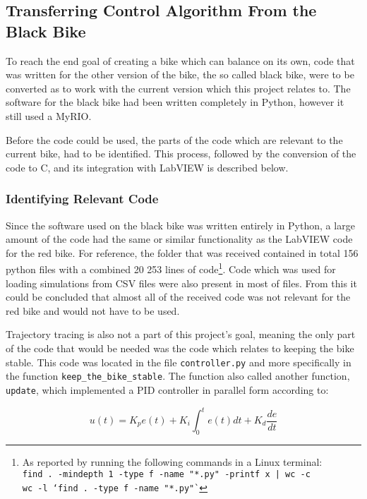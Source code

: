 \subsection{Transferring Control Algorithm From the Black Bike}

To reach the end goal of creating a bike which can balance on its own, code that was written for the other version of the bike, the so called black bike, were to be converted as to work with the current version which this project relates to. The software for the black bike had been written completely in Python, however it still used a MyRIO. 

Before the code could be used, the parts of the code which are relevant to the current bike, had to be identified. This process, followed by the conversion of the code to C, and its integration with LabVIEW is described below.

\subsubsection{Identifying Relevant Code}

Since the software used on the black bike was written entirely in Python, a large amount of the code had the same or similar functionality as the LabVIEW code for the red bike. For reference, the folder that was received contained in total 156 python files with a combined 20 253 lines of code\footnote{As reported by running the following commands in a Linux terminal:\\\texttt{find . -mindepth 1 -type f -name "*.py" -printf x | wc -c}\\\texttt{wc -l `find . -type f -name "*.py"`}}. Code which was used for loading simulations from CSV files were also present in most of files. From this it could be concluded that almost all of the received code was not relevant for the red bike and would not have to be used.

Trajectory tracing is also not a part of this project's goal, meaning the only part of the code that would be needed was the code which relates to keeping the bike stable. This code was located in the file \texttt{controller.py} and more specifically in the function \texttt{keep\_the\_bike\_stable}. The function also called another function, \texttt{update}, which implemented a PID controller in parallel form according to:

\begin{equation*}
    u(t) = K_p e(t) + K_i \int_{0}^{t} e(t)dt + K_d \frac{de}{dt}
\end{equation*}

